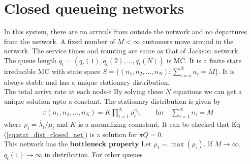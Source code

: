 \documentclass[all-lectures.tex]{subfiles}
\begin{document}
\section{Closed queueing networks}
In this system, there are no arrivals from outside the network and no departures from the network.  A fixed number of $M < \infty$ customers move around in the network. The service times and rounting are same as that of Jackson network. The queue length $q_t = (q_t(1), q_t(2), \dots , q_t(N))$ is MC. It is a finite state irreducible MC with state space $S = \{(n_1,n_2,\dots,n_N): \sum_{i=n}^N n_i = M\}$. It is always stable and has a unique stationary distribution. \\
\indent The total arriva rate at each node-$i$
By solving these $N$ equations we can get a unique solution upto a constant.
The stationary distribution is given by
\begin{align}\label{eq:stat_dist_closed_net}
\pi(n_1, n_2, \dots, n_N) = K \prod_{i=1}^{N} \rho_i^{n_i}, \quad \quad \text{for} \quad \sum_{i=1}^{N} n_i = M
\end{align}
where $\rho_i = \bar{\lambda}_i/\mu_i$ and $K$ is a normalizing connstant. It can be checked that Eq (\ref{eq:stat_dist_closed_net}) is a solution for $\pi Q = 0$.\\
\indent This network has the \textbf{bottleneck property}
Let $\rho_1 = \max( \rho_i)$. If $M \to \infty$, $q_t(1) \to \infty$ in distribution. For other queues
\end{document}
